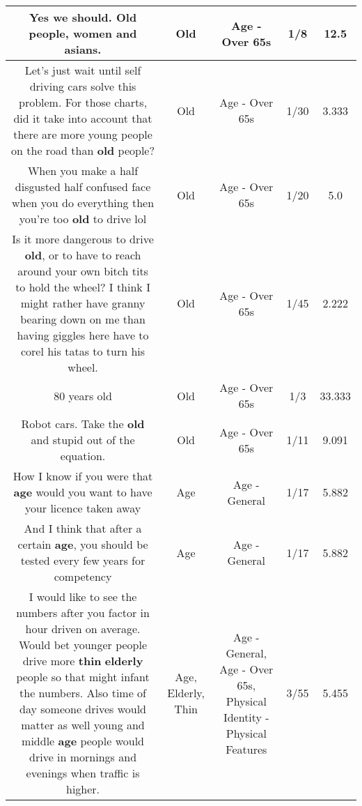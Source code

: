 \documentclass[11pt]{article}
\newlength\mylength
\begin{document}
\begin{center}
\begin{longtable}{|C{.65\mylength}|C{.30\mylength}|C{.12\mylength}|C{.12\mylength}|C{.12\mylength}|}
  \small Yes we should. \textbf{Old} people, women and asians.\normalsize   & Old & Age - Over 65s & 1/8 & 12.5 \\  \hline
  \small Let's just wait until self driving cars solve this problem. For those charts, did it take into account that there are more young people on the road than \textbf{old} people?\normalsize   & Old & Age - Over 65s & 1/30 & 3.333 \\  \hline
  \small When you make a half disgusted half confused face when you do everything then you're too \textbf{old} to drive lol\normalsize   & Old & Age - Over 65s & 1/20 & 5.0 \\  \hline
  \small Is it more dangerous to drive \textbf{old}, or to have to reach around your own bitch tits to hold the wheel? I think I might rather have granny bearing down on me than having giggles here have to corel his tatas to turn his wheel.\normalsize   & Old & Age - Over 65s & 1/45 & 2.222 \\  \hline
  \small 80 years old\normalsize   & Old & Age - Over 65s & 1/3 & 33.333 \\  \hline
  \small Robot cars. Take the \textbf{old} and stupid out of the equation.\normalsize   & Old & Age - Over 65s & 1/11 & 9.091 \\  \hline
  \small How I know if you were that \textbf{age} would you want to have your licence taken away\normalsize   & Age & Age - General & 1/17 & 5.882 \\  \hline
  \small And I think that after a certain \textbf{age}, you should be tested every few years for competency\normalsize   & Age & Age - General & 1/17 & 5.882 \\  \hline
  \small I would like to see the numbers after you factor in hour driven on average. Would bet younger people drive more \textbf{thin} \textbf{elderly} people so that might infant the numbers. Also time of day someone drives would matter as well young and middle \textbf{age} people would drive in mornings and evenings when traffic is higher.\normalsize   & Age, Elderly, Thin & Age - General, Age - Over 65s, Physical Identity - Physical Features & 3/55 & 5.455 \\  \hline

\end{longtable}
\end{center}
\end{document}
